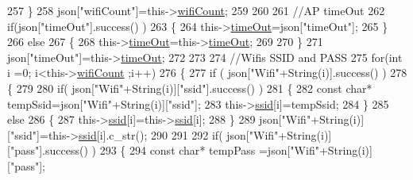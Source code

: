 \begin{DoxyCode}
257             \}
258             json[\textcolor{stringliteral}{"wifiCount"}]=this->\hyperlink{classCoolWifi_ab133bd92fcb895b884deecd6678592e4}{wifiCount};
259 
260             
261             \textcolor{comment}{//AP timeOut}
262             \textcolor{keywordflow}{if}(json[\textcolor{stringliteral}{"timeOut"}].success() )
263             \{
264                 this->\hyperlink{classCoolWifi_a952111605f25156588b5632caaba1c6f}{timeOut}=json[\textcolor{stringliteral}{"timeOut"}];
265             \}
266             \textcolor{keywordflow}{else}
267             \{
268                 this->\hyperlink{classCoolWifi_a952111605f25156588b5632caaba1c6f}{timeOut}=this->\hyperlink{classCoolWifi_a952111605f25156588b5632caaba1c6f}{timeOut};
269 
270             \}
271             json[\textcolor{stringliteral}{"timeOut"}]=this->\hyperlink{classCoolWifi_a952111605f25156588b5632caaba1c6f}{timeOut};
272             
273             
274             \textcolor{comment}{//Wifis SSID and PASS}
275             \textcolor{keywordflow}{for}(\textcolor{keywordtype}{int} i =0; i<this->\hyperlink{classCoolWifi_ab133bd92fcb895b884deecd6678592e4}{wifiCount} ;i++)
276             \{
277                 \textcolor{keywordflow}{if} ( json[\textcolor{stringliteral}{"Wifi"}+String(i)].success() )
278                 \{
279                     
280                     \textcolor{keywordflow}{if}( json[\textcolor{stringliteral}{"Wifi"}+String(i)][\textcolor{stringliteral}{"ssid"}].success() )
281                     \{
282                         \textcolor{keyword}{const} \textcolor{keywordtype}{char}* tempSsid=json[\textcolor{stringliteral}{"Wifi"}+String(i)][\textcolor{stringliteral}{"ssid"}]; 
283                         this->\hyperlink{classCoolWifi_a893b21d0fed821438733bba2e73fb4c2}{ssid}[i]=tempSsid;                 
284                     \}
285                     \textcolor{keywordflow}{else}
286                     \{
287                         this->\hyperlink{classCoolWifi_a893b21d0fed821438733bba2e73fb4c2}{ssid}[i]=this->\hyperlink{classCoolWifi_a893b21d0fed821438733bba2e73fb4c2}{ssid}[i];                    
288                     \}
289                     json[\textcolor{stringliteral}{"Wifi"}+String(i)][\textcolor{stringliteral}{"ssid"}]=this->\hyperlink{classCoolWifi_a893b21d0fed821438733bba2e73fb4c2}{ssid}[i].c\_str();
290                     
291                     
292                     \textcolor{keywordflow}{if}( json[\textcolor{stringliteral}{"Wifi"}+String(i)][\textcolor{stringliteral}{"pass"}].success() )
293                     \{
294                         \textcolor{keyword}{const} \textcolor{keywordtype}{char}* tempPass =json[\textcolor{stringliteral}{"Wifi"}+String(i)][\textcolor{stringliteral}{"pass"}];

\end{DoxyCode}
